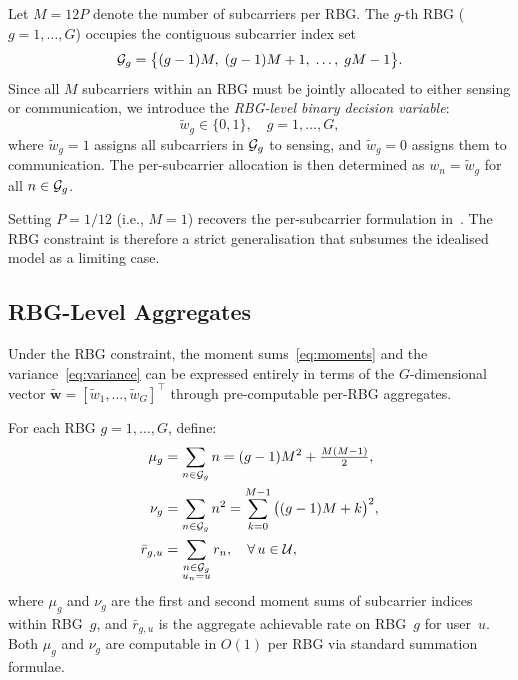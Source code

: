 Let $M = 12P$ denote the number of subcarriers per RBG.
The $g$-th RBG ($g = 1, \ldots, G$) occupies the contiguous subcarrier index set
\begin{equation}
  \mathcal{G}_g = \big\{(g-1)M,\; (g-1)M + 1,\; \ldots,\; gM - 1\big\}.
  \label{eq:rbg_set}
\end{equation}
Since all $M$ subcarriers within an RBG must be jointly allocated to either sensing or communication, we introduce the \emph{RBG-level binary decision variable}:
\begin{equation}
  \tilde{w}_g \in \{0, 1\}, \quad g = 1, \ldots, G,
  \label{eq:rbg_var}
\end{equation}
where $\tilde{w}_g = 1$ assigns all subcarriers in $\mathcal{G}_g$ to sensing, and $\tilde{w}_g = 0$ assigns them to communication.
The per-subcarrier allocation is then determined as $w_n = \tilde{w}_g$ for all $n \in \mathcal{G}_g$.

\begin{remark}
\label{rmk:reduction}
Setting $P = 1/12$ (i.e., $M = 1$) recovers the per-subcarrier formulation in~\cite{ldsa}.
The RBG constraint is therefore a strict generalisation that subsumes the idealised model as a limiting case.
\end{remark}

\subsection{RBG-Level Aggregates}
\label{subsec:rbg_aggregates}

Under the RBG constraint, the moment sums~\eqref{eq:moments} and the variance~\eqref{eq:variance} can be expressed entirely in terms of the $G$-dimensional vector $\tilde{\mathbf{w}} = [\tilde{w}_1, \ldots, \tilde{w}_G]^\top$ through pre-computable per-RBG aggregates.

\begin{definition}
\label{def:aggregates}
For each RBG $g = 1, \ldots, G$, define:
\begin{subequations}\label{eq:rbg_agg}
\begin{align}
  \mu_g &= \sum_{n \in \mathcal{G}_g} n
         = (g-1)M^2 + \tfrac{M(M-1)}{2},
  \label{eq:mu_g} \\
  \nu_g &= \sum_{n \in \mathcal{G}_g} n^2
         = \sum_{k=0}^{M-1} \big((g-1)M + k\big)^2,
  \label{eq:nu_g} \\
  \bar{r}_{g,u} &= \sum_{\substack{n \in \mathcal{G}_g \\ u_n = u}} r_n, \quad \forall\, u \in \mathcal{U},
  \label{eq:rate_rbg}
\end{align}
\end{subequations}
where $\mu_g$ and $\nu_g$ are the first and second moment sums of subcarrier indices within RBG~$g$, and $\bar{r}_{g,u}$ is the aggregate achievable rate on RBG~$g$ for user~$u$.
Both $\mu_g$ and $\nu_g$ are computable in $O(1)$ per RBG via standard summation formulae.
\end{definition}

